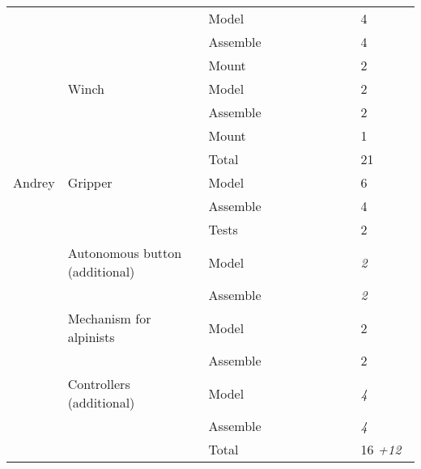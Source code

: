 \begin{table}[H]
\begin{center}
\begin{tabular}{|p{0.12\linewidth}|p{0.35\linewidth}|p{0.38\linewidth}|p{0.15\linewidth}|}
		& & Model &	4 \\
		& & Assemble & 4 \\                                  
		& & Mount & 2 \\
		\hline                                     
		& Winch & Model & 2 \\                               
		& & Assemble & 2 \\                                 
		& & Mount & 1 \\                                     
		& & Total & 21 \\                                   
		\hline
		\hline                                            
		Andrey & Gripper & Model & 6 \\                             
		& & Assemble & 4 \\                
		& & Tests & 2 \\                                   
		\hline
		& Autonomous button (additional)	& Model & \textit{2} \\                   
		& & Assemble & \textit{2} \\             
		\hline
		& Mechanism for alpinists & Model & 2 \\             
		& & Assemble & 2 \\                                  
		\hline
		& Controllers (additional) & Model & \textit{4} \\                        
		& & Assemble & \textit{4} \\
		\hline                                  
		& & Total & 16 \textit{+12} \\                              
		
		\hline
	\end{tabular}
\end{center}
\end{table} 
